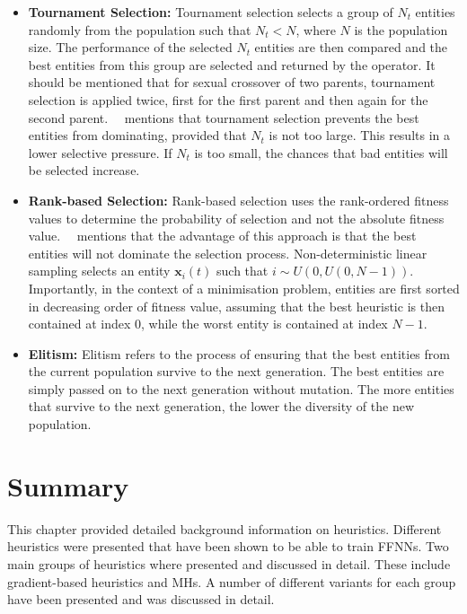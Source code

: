\begin{itemize}
      \item \textbf{Tournament Selection:} Tournament selection selects a group of $N_{t}$ entities randomly from the population such that $N_{t} < N$, where $N$ is the population size. The performance of the selected $N_{t}$ entities are then compared and the best entities from this group are selected and returned by the operator. It should be mentioned that for sexual crossover of two parents, tournament selection is applied twice, first for the first parent and then again for the second parent.~\citeauthor{ref:engelbrecht:2007}~\cite{ref:engelbrecht:2007} mentions that tournament selection prevents the best entities from dominating, provided that $N_{t}$ is not too large. This results in a lower selective pressure. If $N_{t}$ is too small, the chances that bad entities will be selected increase.

      \item \textbf{Rank-based Selection:} Rank-based selection uses the rank-ordered fitness values to determine the probability of selection and not the absolute fitness value.~\citeauthor{ref:engelbrecht:2007}~\cite{ref:engelbrecht:2007} mentions that the advantage of this approach is that the best entities will not dominate the selection process. Non-deterministic linear sampling selects an entity $\boldsymbol{x}_{i}(t)$ such that $i \sim U(0, U(0, N - 1))$. Importantly, in the context of a minimisation problem, entities are first sorted in decreasing order of fitness value, assuming that the best heuristic is then contained at index 0, while the worst entity is contained at index $N - 1$.

      \item \textbf{Elitism:} Elitism refers to the process of ensuring that the best entities from the current population survive to the next generation. The best entities are simply passed on to the next generation without mutation. The more entities that survive to the next generation, the lower the diversity of the new population.
\end{itemize}


\section{Summary}
\label{sec:heuristics:summary}

This chapter provided detailed background information on heuristics. Different heuristics were presented that have been shown to be able to train \acp{FFNN}. Two main groups of heuristics where presented and discussed in detail. These include gradient-based heuristics and \acfp{MH}. A number of different variants for each group have been presented and was discussed in detail.
